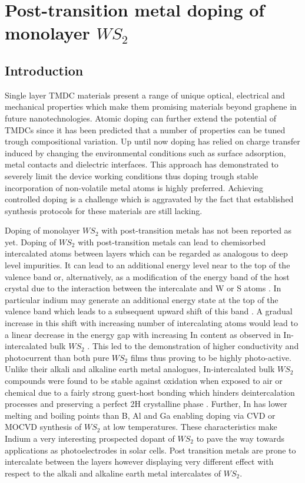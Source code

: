 \chapter{Post-transition metal doping of monolayer $WS_2$}

\section{Introduction}

Single layer TMDC materials present a range of unique optical, electrical and mechanical properties which make them promising materials beyond graphene in future nanotechnologies. Atomic doping can further extend the potential of TMDCs since it has been predicted that a number of properties can be tuned trough compositional variation. Up until now doping has relied on charge transfer induced by changing the environmental conditions such as surface adsorption, metal contacts and dielectric interfaces. This approach has demonstrated to severely limit the device working conditions thus doping trough stable incorporation of non-volatile metal atoms is highly preferred. Achieving controlled doping is a challenge which is aggravated by the fact that established synthesis protocols for these materials are still lacking.

Doping of monolayer $WS_2$ with post-transition metals has not been reported as yet. Doping of $WS_2$ with post-transition metals can lead to chemisorbed intercalated atoms between layers which can be regarded as analogous to deep level impurities. It can lead to an additional energy level near to the top of the valence band or, alternatively, as a modification of the energy band of the host crystal due to the interaction between the intercalate and W or S atoms \cite{Yacobi1979}\cite{Yacobi1979a}. In particular indium may generate an additional energy state at the top of the valence band which leads to a subsequent upward shift of this band \cite{Deshpande2001}. A gradual increase in this shift with increasing number of intercalating atoms would lead to a linear decrease in the energy gap with increasing In content as observed in In-intercalated bulk $WS_2$ \cite{Deshpande2001}. This led to the demonstration of higher conductivity and photocurrent than both pure $WS_2$ films thus proving to be highly photo-active. Unlike their alkali and alkaline earth metal analogues, In-intercalated bulk $WS_2$ compounds were found to be stable against oxidation when exposed to air or chemical due to a fairly strong guest-host bonding which hinders deintercalation processes and preserving a perfect 2H crystalline phase \cite{Deshpande2001}\cite{Rao1981}. Further, In has lower melting and boiling points than B, Al and Ga enabling doping via CVD or MOCVD synthesis of $WS_2$ at low temperatures. These characteristics make Indium a very interesting prospected dopant of $WS_2$ to pave the way towards applications as photoelectrodes in solar cells. Post transition metals are prone to intercalate between the layers however displaying very different effect with respect to the alkali and alkaline earth metal intercalates of $WS_2$.

